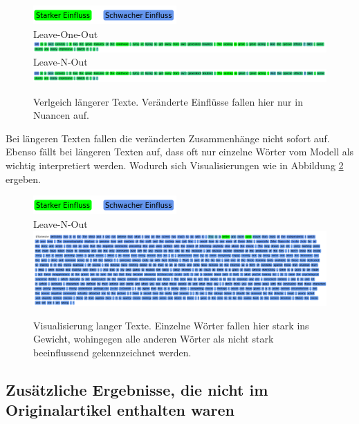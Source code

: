 \documentclass[DIV=13,fontsize=11pt]{scrartcl}
\begin{document}
\begin{figure}[H]
    \centering
    \includegraphics[]{img/legend.png}\\
    Leave-One-Out\\
    \includegraphics[width=\linewidth]{img/new_ex1_loo.png}\\
    Leave-N-Out\\
    \includegraphics[width=\linewidth]{img/new_ex1_lno.png}
    \caption{Verlgeich längerer Texte. Veränderte Einflüsse fallen hier nur in Nuancen auf.}
    \label{fig:ex5}
\end{figure}

Bei längeren Texten fallen die veränderten Zusammenhänge nicht sofort auf. Ebenso fällt bei längeren Texten auf, dass
oft nur einzelne Wörter vom Modell als wichtig interpretiert werden. Wodurch sich Visualisierungen wie in Abbildung \ref{fig:ex6} ergeben.

\begin{figure}[H]
    \centering
    \includegraphics[]{img/legend.png}\\
    Leave-N-Out\\
    \includegraphics[width=\linewidth]{img/long_ex_lno.png}
    \caption{Visualisierung langer Texte. Einzelne Wörter fallen hier stark ins Gewicht, wohingegen alle anderen Wörter als nicht stark beeinflussend gekennzeichnet werden.}
    \label{fig:ex6}
\end{figure}

\subsection{Zusätzliche Ergebnisse, die nicht im Originalartikel enthalten waren}
\end{document}

